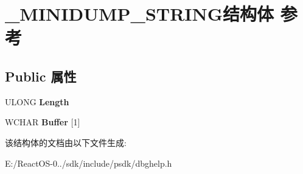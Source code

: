 \hypertarget{struct___m_i_n_i_d_u_m_p___s_t_r_i_n_g}{}\section{\+\_\+\+M\+I\+N\+I\+D\+U\+M\+P\+\_\+\+S\+T\+R\+I\+N\+G结构体 参考}
\label{struct___m_i_n_i_d_u_m_p___s_t_r_i_n_g}
\subsection*{Public 属性}
\begin{DoxyCompactItemize}
\item 
\mbox{\label{struct___m_i_n_i_d_u_m_p___s_t_r_i_n_g_a2689c18968300a8e787695db604fb1d0}} 
U\+L\+O\+NG {\bfseries Length}
\item 
\mbox{\label{struct___m_i_n_i_d_u_m_p___s_t_r_i_n_g_a4993db5d9cde6e4db0bbe1503352fe02}} 
W\+C\+H\+AR {\bfseries Buffer} \mbox{[}1\mbox{]}
\end{DoxyCompactItemize}


该结构体的文档由以下文件生成\+:\begin{DoxyCompactItemize}
\item 
E\+:/\+React\+O\+S-\/0../sdk/include/psdk/dbghelp.\+h\end{DoxyCompactItemize}
